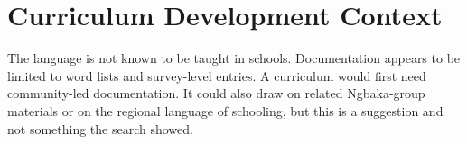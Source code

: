 \documentclass[12pt]{article}
\begin{document}
\section{Curriculum Development Context}
The language is not known to be taught in schools. Documentation appears to be limited to word lists and survey-level entries. A curriculum would first need community-led documentation. It could also draw on related Ngbaka-group materials or on the regional language of schooling, but this is a suggestion and not something the search showed.
\end{document}
